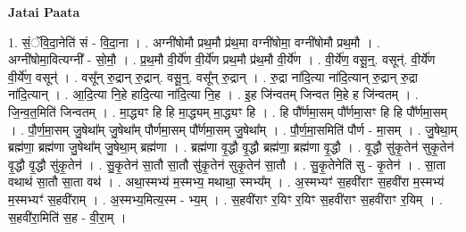 \documentclass[17pt]{extarticle}
\begin{document}
\textbf{Jatai Paata} \newline

1. सं॒ॅवि॒दा॒नेति॑ सं - वि॒दा॒ना । . अग्नी॑षोमौ प्रथ॒मौ प्र॑थ॒मा वग्नी॑षोमा॒ वग्नी॑षोमौ प्रथ॒मौ । . अग्नी॑षोमा॒वित्यग्नी᳚ - सो॒मौ॒ । . प्र॒थ॒मौ वी॒र्ये॑ण वी॒र्ये॑ण प्रथ॒मौ प्र॑थ॒मौ वी॒र्ये॑ण । . वी॒र्ये॑ण॒ वसू॒न्॒. वसून्॑. वी॒र्ये॑ण वी॒र्ये॑ण॒ वसून्॑ । . वसू᳚न् रु॒द्रान् रु॒द्रान्. वसू॒न्॒. वसू᳚न् रु॒द्रान् । . रु॒द्रा ना॑दि॒त्या ना॑दि॒त्यान् रु॒द्रान् रु॒द्रा ना॑दि॒त्यान् । . आ॒दि॒त्या नि॒हे हादि॒त्या ना॑दि॒त्या नि॒ह । . इ॒ह जि॑न्वतम् जिन्वत मि॒हे ह जि॑न्वतम् । . जि॒न्व॒त॒मिति॑ जिन्वतम् । . मा॒द्ध्यꣳ हि हि मा॒द्ध्यम् मा॒द्ध्यꣳ हि । . हि पौ᳚र्णमा॒सम् पौ᳚र्णमा॒सꣳ हि हि पौ᳚र्णमा॒सम् । . पौ॒र्ण॒मा॒सम् जु॒षेथा᳚म् जु॒षेथा᳚म् पौर्णमा॒सम् पौ᳚र्णमा॒सम् जु॒षेथा᳚म् । . पौ॒र्ण॒मा॒समिति॑ पौर्ण - मा॒सम् । . जु॒षेथा॒म् ब्रह्म॑णा॒ ब्रह्म॑णा जु॒षेथा᳚म् जु॒षेथा॒म् ब्रह्म॑णा । . ब्रह्म॑णा वृ॒द्धौ वृ॒द्धौ ब्रह्म॑णा॒ ब्रह्म॑णा वृ॒द्धौ । . वृ॒द्धौ सु॑कृ॒तेन॑ सुकृ॒तेन॑ वृ॒द्धौ वृ॒द्धौ सु॑कृ॒तेन॑ । . सु॒कृ॒तेन॑ सा॒तौ सा॒तौ सु॑कृ॒तेन॑ सुकृ॒तेन॑ सा॒तौ । . सु॒कृ॒तेनेति॑ सु - कृ॒तेन॑ । . सा॒ता वथाथ॑ सा॒तौ सा॒ता वथ॑ । . अथा॒स्मभ्य॑ म॒स्मभ्य॒ मथाथा॒ स्मभ्य᳚म् । . अ॒स्मभ्यꣳ॑ स॒हवी॑राꣳ स॒हवी॑रा म॒स्मभ्य॑ म॒स्मभ्यꣳ॑ स॒हवी॑राम् । . अ॒स्मभ्य॒मित्य॒स्म - भ्य॒म् । . स॒हवी॑राꣳ र॒यिꣳ र॒यिꣳ स॒हवी॑राꣳ स॒हवी॑राꣳ र॒यिम् । . स॒हवी॑रा॒मिति॑ स॒ह - वी॒रा॒म् । \newline
\end{document}
